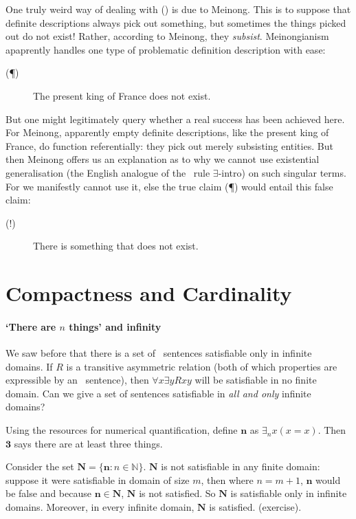 One truly weird way of dealing with (\ddag) is due to Meinong. This is to suppose that definite descriptions always pick out something, but sometimes the things picked out do not exist! Rather, according to Meinong, they \emph{subsist}. Meinongianism apaprently handles one type of problematic definition description with ease:
\begin{description}
	\item [(\P)] The present king of France does not exist.
\end{description} 
But one might legitimately query whether a real success has been achieved here. For Meinong, apparently empty definite descriptions, like the present king of France, do function referentially: they pick out merely subsisting entities. But then Meinong offers us an explanation as to why we cannot use existential generalisation (the English analogue of the \ltwo\ rule $\exists$-intro) on such singular terms. For we manifestly cannot use it, else the true claim (\P) would entail this false claim:
\begin{description}
	\item [(!)] There is something that does not exist.
\end{description} 



\section{Compactness and Cardinality}
\paragraph{`There are $n$ things' and infinity}

We saw before that there is a set of \lequ\ sentences satisfiable only in infinite domains.  If $R$ is a transitive asymmetric relation (both of which properties are expressible by an \lequ\ sentence), then $\forall x \exists y Rxy$ will be satisfiable in no finite domain. Can we give a set of sentences satisfiable in \emph{all and only} infinite domains?

Using the resources for numerical quantification, define $\mathbf{n}$ as $\exists_{n} x (x=x)$. Then $\mathbf{3}$ says there are at least three things.

 Consider the set $\mathbf{N} = \{\mathbf{n} : n \in \mathbb{N}\}$. $\mathbf{N}$ is not satisfiable in any finite domain: suppose it were satisfiable in domain of size $m$, then where $n=m+1$, $\mathbf{n}$ would be false and  because $\mathbf{n} \in \mathbf{N}$, $\mathbf{N}$ is not satisfied. So $\mathbf{N}$ is satisfiable only in infinite domains. Moreover, in every infinite domain, $\mathbf{N}$ is satisfied. (exercise). 

